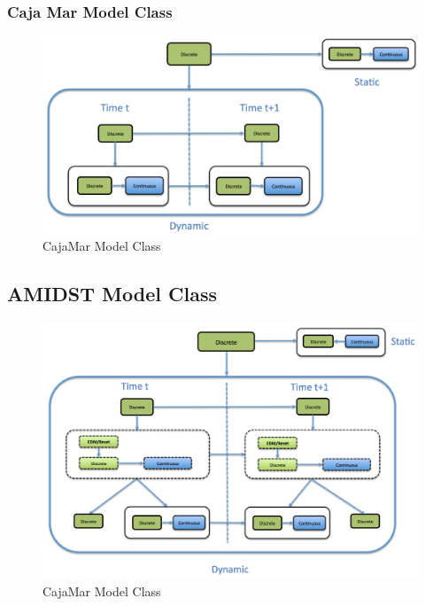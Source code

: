 \subsubsection*{Caja Mar Model Class}

\begin{figure}
\begin{center}
\caption{\label{Figure:CajaMarModelClass} CajaMar Model Class}
\includegraphics[scale=0.4]{./figures/CajaMarModelClass}
\end{center}
\end{figure}



\subsection{AMIDST Model Class}




\begin{figure}
\begin{center}
\caption{\label{Figure:AMIDSTModelClass} CajaMar Model Class}
\includegraphics[scale=0.7]{./figures/AMIDSTModelClass}
\end{center}
\end{figure}